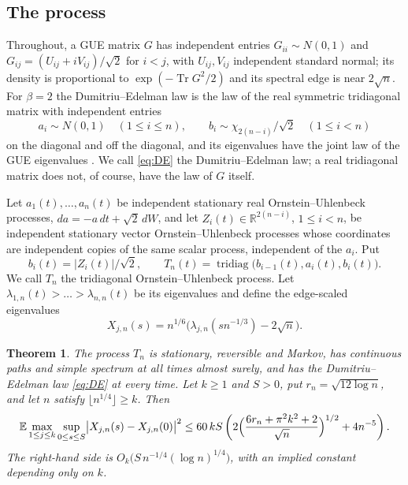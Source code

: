 \documentclass[11pt]{amsart}
\newtheorem{theorem}{Theorem}[section]
\theoremstyle{remark}
\newcommand{\EE}{\mathbb{E}}
\newcommand{\RR}{\mathbb{R}}
\newcommand{\Tr}{\operatorname{Tr}}
\begin{document}
\subsection{The process}\label{sec:process}
Throughout, a GUE matrix $G$ has independent entries $G_{ii}\sim N(0,1)$ and $G_{ij}=(U_{ij}+iV_{ij})/\sqrt2$ for
$i<j$, with $U_{ij},V_{ij}$ independent standard normal; its density is proportional to $\exp(-\Tr G^2/2)$ and its
spectral edge is near $2\sqrt n$. For $\beta=2$ the Dumitriu--Edelman law is the law of the real symmetric tridiagonal
matrix with independent entries
\begin{equation}\label{eq:DE}
a_i\sim N(0,1)\quad(1\le i\le n),\qquad b_i\sim\chi_{2(n-i)}/\sqrt2\quad(1\le i<n)
\end{equation}
on the diagonal and off the diagonal, and its eigenvalues have the joint law of the GUE eigenvalues
\cite[Theorem~2.12]{DE02}. We call \eqref{eq:DE} the Dumitriu--Edelman law; a real tridiagonal matrix does not, of
course, have the law of $G$ itself.

Let $a_1(t),\dots,a_n(t)$ be independent stationary real Ornstein--Uhlenbeck processes, $da=-a\,dt+\sqrt2\,dW$, and let
$Z_i(t)\in\RR^{2(n-i)}$, $1\le i<n$, be independent stationary vector Ornstein--Uhlenbeck processes whose coordinates are
independent copies of the same scalar process, independent of the $a_i$. Put
\begin{equation}\label{eq:process}
b_i(t)=|Z_i(t)|/\sqrt2,\qquad T_n(t)=\operatorname{tridiag}\bigl(b_{i-1}(t),a_i(t),b_i(t)\bigr).
\end{equation}
We call $T_n$ the tridiagonal Ornstein--Uhlenbeck process. Let $\lambda_{1,n}(t)>\dots>\lambda_{n,n}(t)$ be its
eigenvalues and define the edge-scaled eigenvalues
\begin{equation}\label{eq:X}
X_{j,n}(s)=n^{1/6}\bigl(\lambda_{j,n}(sn^{-1/3})-2\sqrt n\bigr).
\end{equation}

\begin{theorem}\label{thm:main}
The process $T_n$ is stationary, reversible and Markov, has continuous paths and simple spectrum at all times almost
surely, and has the Dumitriu--Edelman law \eqref{eq:DE} at every time. Let $k\ge1$ and $S>0$, put
$r_n=\sqrt{12\log n}$, and let $n$ satisfy $\lfloor n^{1/4}\rfloor\ge k$. Then
\begin{equation}\label{eq:main}
\EE\max_{1\le j\le k}\sup_{0\le s\le S}\bigl|X_{j,n}(s)-X_{j,n}(0)\bigr|^2
\le 60\,kS\left(2\Bigl(\frac{6r_n+\pi^2k^2+2}{\sqrt n}\Bigr)^{1/2}+4n^{-5}\right).
\end{equation}
The right-hand side is $O_k\bigl(S\,n^{-1/4}(\log n)^{1/4}\bigr)$, with an implied constant depending only on $k$.
\end{theorem}
\end{document}
